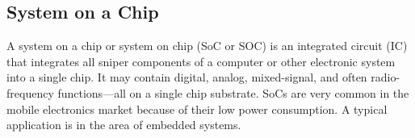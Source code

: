 \subsection{System on a Chip}
A system on a chip or system on chip (SoC or SOC) is an integrated circuit (IC) that integrates all sniper components of a computer or other electronic system into a single chip. It may contain digital, analog, mixed-signal, and often radio-frequency functions—all on a single chip substrate. SoCs are very common in the mobile electronics market because of their low power consumption. A typical application is in the area of embedded systems.

\cleardoublepage